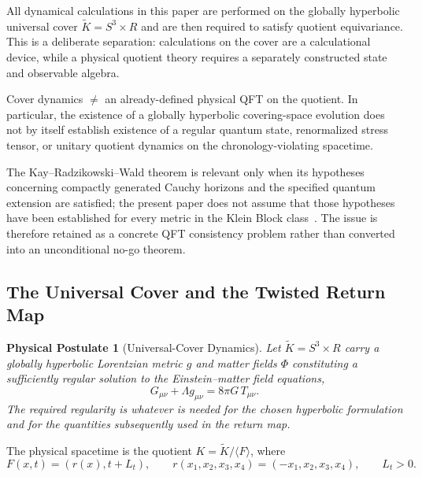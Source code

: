 \documentclass[11pt]{article}
\theoremstyle{canonmath}
\theoremstyle{canonpostulate}
\newtheorem{postulate}{Physical Postulate}[section]
\theoremstyle{canonclaim}
\providecommand{\Klein}{\mathcal{K}}
\providecommand{\R}{\mathbb{R}}
\providecommand{\Sthree}{S^3}
\def\mathbb#1{#1}%
\def\mathcal#1{#1}%
\begin{document}
All dynamical calculations in this paper are performed on the globally hyperbolic universal cover $\widetilde{\Klein}=\Sthree\times\R$ and are then required to satisfy quotient equivariance. This is a deliberate separation: calculations on the cover are a calculational device, while a physical quotient theory requires a separately constructed state and observable algebra.

\begin{keyresult}
Cover dynamics $\neq$ an already-defined physical QFT on the quotient. In particular, the existence of a globally hyperbolic covering-space evolution does not by itself establish existence of a regular quantum state, renormalized stress tensor, or unitary quotient dynamics on the chronology-violating spacetime.
\end{keyresult}

The Kay--Radzikowski--Wald theorem is relevant only when its hypotheses concerning compactly generated Cauchy horizons and the specified quantum extension are satisfied; the present paper does not assume that those hypotheses have been established for every metric in the Klein Block class~\cite{KayRadzikowskiWald}. The issue is therefore retained as a concrete QFT consistency problem rather than converted into an unconditional no-go theorem.

\subsection{The Universal Cover and the Twisted Return Map}

\begin{postulate}[Universal-Cover Dynamics] \label{post:cover}
Let $\widetilde{\Klein}=\Sthree\times\R$ carry a globally hyperbolic Lorentzian metric $g$ and matter fields $\Phi$ constituting a sufficiently regular solution to the Einstein--matter field equations,
\begin{equation}
G_{\mu\nu}+\Lambda g_{\mu\nu}=8\pi G\,T_{\mu\nu}.
\end{equation}
The required regularity is whatever is needed for the chosen hyperbolic formulation and for the quantities subsequently used in the return map.
\end{postulate}

The physical spacetime is the quotient $\Klein=\widetilde{\Klein}/\langle F\rangle$, where
\begin{equation}
F(x,t)=(r(x),t+L_t),
\qquad
r(x_1,x_2,x_3,x_4)=(-x_1,x_2,x_3,x_4),
\qquad L_t>0.
\end{equation}
\end{document}
